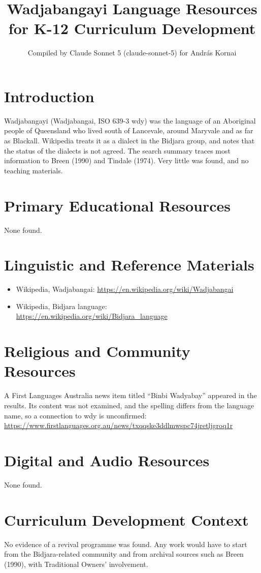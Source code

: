 \documentclass[12pt]{article}
\title{Wadjabangayi Language Resources for K-12 Curriculum Development}
\author{Compiled by Claude Sonnet 5 (claude-sonnet-5) for Andr\'as Kornai}
\date{}
\begin{document}
\maketitle

\section{Introduction}
Wadjabangayi (Wadjabangai, ISO 639-3 wdy) was the language of an Aboriginal people of Queensland who lived south of Lancevale, around Maryvale and as far as Blackall. Wikipedia treats it as a dialect in the Bidjara group, and notes that the status of the dialects is not agreed. The search summary traces most information to Breen (1990) and Tindale (1974). Very little was found, and no teaching materials.

\section{Primary Educational Resources}
None found.

\section{Linguistic and Reference Materials}
\begin{itemize}
\item Wikipedia, Wadjabangai: \url{https://en.wikipedia.org/wiki/Wadjabangai}
\item Wikipedia, Bidjara language: \url{https://en.wikipedia.org/wiki/Bidjara_language}
\end{itemize}

\section{Religious and Community Resources}
A First Languages Australia news item titled ``Binbi Wadyabay'' appeared in the results. Its content was not examined, and the spelling differs from the language name, so a connection to wdy is unconfirmed: \url{https://www.firstlanguages.org.au/news/txqqske3ddlmwspc74jretljgroq1r}

\section{Digital and Audio Resources}
None found.

\section{Curriculum Development Context}
No evidence of a revival programme was found. Any work would have to start from the Bidjara-related community and from archival sources such as Breen (1990), with Traditional Owners' involvement.
\end{document}
